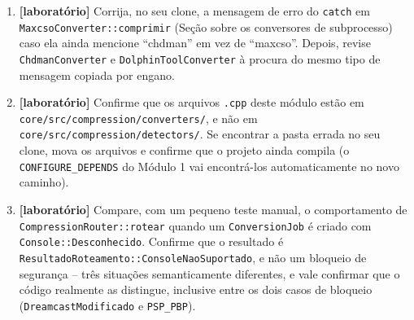 \begin{CaixaDesafio}
\begin{enumerate}[label=\textbf{3.\arabic*}]
    \item \textbf{[laboratório]} Corrija, no seu clone, a mensagem de erro do \texttt{catch} em \texttt{MaxcsoConverter::comprimir} (Seção sobre os conversores de subprocesso) caso ela ainda mencione ``chdman'' em vez de ``maxcso''. Depois, revise \texttt{ChdmanConverter} e \texttt{DolphinToolConverter} à procura do mesmo tipo de mensagem copiada por engano.
    \item \textbf{[laboratório]} Confirme que os arquivos \texttt{.cpp} deste módulo estão em \texttt{core/src/compression/converters/}, e não em \texttt{core/src/compression/detectors/}. Se encontrar a pasta errada no seu clone, mova os arquivos e confirme que o projeto ainda compila (o \texttt{CONFIGURE\_DEPENDS} do Módulo 1 vai encontrá-los automaticamente no novo caminho).
    \item \textbf{[laboratório]} Compare, com um pequeno teste manual, o comportamento de \texttt{CompressionRouter::rotear} quando um \texttt{ConversionJob} é criado com \texttt{Console::Desconhecido}. Confirme que o resultado é \texttt{ResultadoRoteamento::ConsoleNaoSuportado}, e não um bloqueio de segurança -- três situações semanticamente diferentes, e vale confirmar que o código realmente as distingue, inclusive entre os dois casos de bloqueio (\texttt{DreamcastModificado} e \texttt{PSP\_PBP}).
\end{enumerate}
\end{CaixaDesafio}

